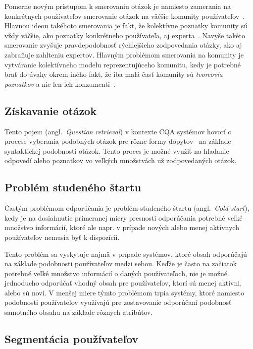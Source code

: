 Pomerne novým prístupom k smerovaniu otázok je namiesto zamerania na konkrétnych používateľov smerovanie otázok na väčšie
komunity používateľov~\cite{Liu2014}. Hlavnou ideou takéhoto smerovania je fakt, že kolektívne poznatky komunity sú vždy väčšie, ako
poznatky konkrétneho používateľa, aj experta~\cite{Pal2013}. Navyše takéto smerovanie zvyšuje pravdepodobnosť rýchlejšieho zodpovedania
otázky, ako aj zabraňuje zahlteniu expertov. Hlavným problémom smerovania na komunity je vytváranie kolektívneho modelu
reprezentujúceho komunitu, kedy je potrebné brať do úvahy okrem iného fakt, že iba malá časť komunity sú \emph{tvorcovia
poznatkov} a nie len ich konzumenti~\cite{Pal2015}.


\subsection{Získavanie otázok}

Tento pojem (angl.~\emph{Question retrieval}) v kontexte CQA systémov hovorí o procese vyberania podobných otázok pre
rôzne formy dopytov~\cite{Zhang2014} na základe syntaktickej podobnosti otázok.
Tento proces je možné využiť na hľadanie odpovedí alebo poznatkov vo veľkých množstvách už zodpovedaných otázok.


\subsection{Problém studeného štartu}\label{cold-start}

Častým problémom odporúčania je problém studeného štartu (angl.~\emph{Cold start}), kedy je na dosiahnutie primeranej
miery presnosti odporúčania potrebné veľké množstvo informácií, ktoré ale napr. v prípade nových alebo menej aktívnych
používateľov nemusia byť k dispozícii.

Tento problém sa vyskytuje najmä v prípade systémov, ktoré obsah odporúčajú na základe
podobnosti používateľov medzi sebou. Keďže je často na začiatok potrebné veľké množstvo informácií o daných používateľoch,
nie je možné jednoducho odporúčať vhodný obsah pre používateľov, ktorí sú menej aktívni, alebo sú noví.
V menšej miere týmto problémom trpia systémy, ktoré namiesto podobnosti používateľov využívajú pre zostavovanie odporúčaní
podobnosť samotného obsahu na základe rôznych atribútov.

\subsection{Segmentácia používateľov}

